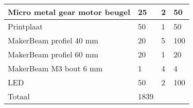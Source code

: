 \documentclass[a4paper,kulak]{kulakarticle} %
\begin{document}
\begin{center}
\begin{tabular}{|l|l|l|l|}
		Micro metal gear motor beugel         & 25                           & 2               & 50                            \\ \hline
		Printplaat                            & 50                           & 1               & 50                            \\ \hline
		MakerBeam profiel 40 mm & 20 & 5 & 100\\ \hline
		MakerBeam profiel 60 mm & 20 & 1 & 20 \\ \hline
		MakerBeam M3 bout 6 mm & 1 & 4 & 4 \\ \hline
		LED & 50 & 2 & 100\\ \hline
		Totaal & 1839 & \cellcolor{black} & \cellcolor{black} \\ \hline
	\end{tabular}
	
\end{center}
\end{document}
